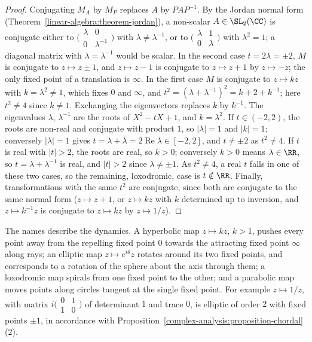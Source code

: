 \begin{proof}
Conjugating $M_A$ by $M_P$ replaces $A$ by $PAP^{-1}$. By the Jordan normal form (Theorem~\ref{linear-algebra:theorem-jordan}), a non-scalar $A \in \SL_2(\CC)$ is conjugate either to
$\bigl(\begin{smallmatrix}\lambda & 0\\ 0 & \lambda^{-1}\end{smallmatrix}\bigr)$ with $\lambda \neq \lambda^{-1}$, or to $\bigl(\begin{smallmatrix}\lambda & 1\\ 0 & \lambda\end{smallmatrix}\bigr)$ with $\lambda^2 = 1$; a diagonal matrix
with $\lambda = \lambda^{-1}$ would be scalar. In the second case $t = 2\lambda = \pm2$, $M$ is conjugate to $z \mapsto z \pm 1$, and $z \mapsto z - 1$ is conjugate to $z \mapsto z + 1$ by $z \mapsto -z$; the only
fixed point of a translation is $\infty$. In the first case $M$ is conjugate to $z \mapsto kz$ with $k = \lambda^2 \neq 1$, which fixes $0$ and $\infty$, and $t^2 = (\lambda + \lambda^{-1})^2 = k + 2 + k^{-1}$; here $t^2 \neq 4$
since $k \neq 1$. Exchanging the eigenvectors replaces $k$ by $k^{-1}$. The eigenvalues $\lambda$, $\lambda^{-1}$ are the roots of $X^2 - tX + 1$, and $k = \lambda^2$. If $t \in (-2, 2)$, the roots are non-real and
conjugate with product $1$, so $|\lambda| = 1$ and $|k| = 1$; conversely $|\lambda| = 1$ gives $t = \lambda + \bar\lambda = 2\operatorname{Re}\lambda \in [-2, 2]$, and $t \neq \pm2$ as $t^2 \neq 4$. If $t$ is real with $|t| > 2$, the
roots are real, so $k > 0$; conversely $k > 0$ means $\lambda \in \RR$, so $t = \lambda + \lambda^{-1}$ is real, and $|t| > 2$ since $\lambda \neq \pm1$. As $t^2 \neq 4$, a real $t$ falls in one of these two cases, so the
remaining, loxodromic, case is $t \notin \RR$. Finally, transformations with the same $t^2$ are
conjugate, since both are conjugate to the same normal form ($z \mapsto z + 1$, or $z \mapsto kz$ with $k$ determined up to inversion, and $z \mapsto k^{-1}z$ is conjugate to $z \mapsto kz$ by $z \mapsto 1/z$).
\end{proof}

The names describe the dynamics. A hyperbolic map $z \mapsto kz$, $k > 1$, pushes every point away from the repelling fixed point $0$ towards the attracting fixed point $\infty$ along rays; an elliptic map
$z \mapsto e^{i\theta}z$ rotates around its two fixed points, and corresponds to a rotation of the sphere about the axis through them; a loxodromic map spirals from one fixed point to the other; and a parabolic map
moves points along circles tangent at the single fixed point. For example $z \mapsto 1/z$, with matrix $i\bigl(\begin{smallmatrix}0 & 1\\ 1 & 0\end{smallmatrix}\bigr)$ of determinant $1$ and trace $0$, is elliptic of
order $2$ with fixed points $\pm1$, in accordance with Proposition~\ref{complex-analysis:proposition-chordal}(2).

